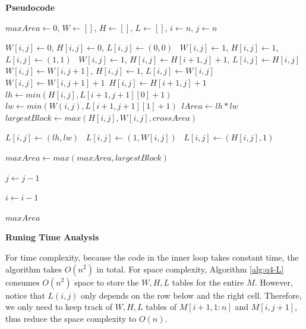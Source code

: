 \documentclass[12pt,article]{article}
\begin{document}
\textbf{Pseudocode}
\begin{algorithm}
\caption{$M[1:n,1:n]$}\label{alg:q4-L}
\begin{algorithmic}
    \EndIf

    \State $maxArea \gets 0$, $W \gets []$, $H \gets []$, $L \gets []$, $i \gets n$, $j \gets n$

                \State $W[i,j] \gets 0$, $H[i,j] \gets 0$, $L[i,j] \gets (0,0)$\
                \State $W[i,j] \gets 1$, $H[i,j] \gets 1$, $L[i,j] \gets (1,1)$\
                \State $W[i,j] \gets 1$, $H[i,j] \gets H[i+1,j] + 1$, $L[i,j] \gets H[i,j]$\
                \State $W[i,j] \gets W[i,j+1]$, $H[i,j] \gets 1$, $L[i,j] \gets W[i,j]$\
            \Else
                \State $W[i,j] \gets W[i,j+1] + 1$\
                \State $H[i,j] \gets H[i+1,j] + 1$\
                \State $lh \gets min(H[i,j], L[i+1,j+1][0] + 1)$\
                \State $lw \gets min(W(i,j), L[i+1,j+1][1] + 1)$\
                \State $lArea \gets lh * lw$\
                \State $largestBlock \gets max(H[i,j], W[i,j], crossArea)$\

                \If{$lArea == largestBlock$}
                    \State $L[i,j] \gets (lh,lw)$\
                    \State $L[i,j] \gets (1,W[i,j])$\
                \Else
                    \State $L[i,j] \gets (H[i,j],1)$\
                \EndIf

                \State $maxArea \gets max(maxArea, largestBlock)$\
            \EndIf

            \State $j \gets j - 1$
        \EndWhile

        \State $i \gets i - 1$
    \EndWhile

    \Return $maxArea$
\end{algorithmic}
\end{algorithm}

\newpage
\textbf{Runing Time Analysis}

For time complexity, because the code in the inner loop takes constant time, the algorithm takes $O(n^2)$ in total. For space complexity, Algorithm \ref{alg:q4-L} consumes $O(n^2)$ space to store the $W,H,L$ tables for the entire $M$. However, notice that $L(i,j)$ only depends on the row below and the right cell. Therefore, we only need to keep track of $W,H,L$ tables of $M[i+1,1:n]$ and $M[i,j+1]$, thus reduce the space complexity to $O(n)$.

\newpage


\end{document}
